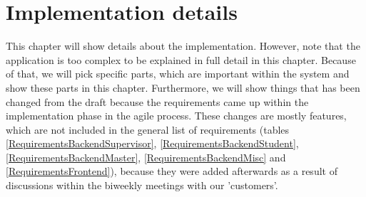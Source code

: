\chapter[Implementation details]{Implementation details}
\label{implementation}

This chapter will show details about the implementation. However, note that the application is too complex to be explained in full detail in this chapter. Because of that, we will pick specific parts, which are important within the system and show these parts in this chapter.
Furthermore, we will show things that has been changed from the draft because the requirements came up within the implementation phase in the agile process. These changes are mostly features, which are not included in the general list of requirements (tables \ref{RequirementsBackendSupervisor}, \ref{RequirementsBackendStudent}, \ref{RequirementsBackendMaster}, \ref{RequirementsBackendMisc} and \ref{RequirementsFrontend}), because they were added afterwards as a result of discussions within the biweekly meetings with our 'customers'.